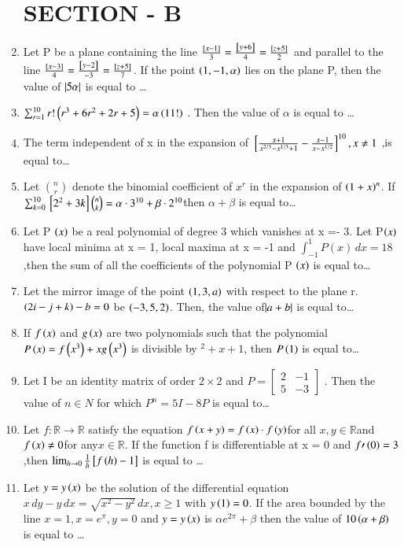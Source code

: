 \documentclass[journal,12pt,twocolumn]{IEEEtran}
\theoremstyle{remark}
\begin{document}
\begin{enumerate}[start=16]
\section{SECTION - B}
\item Let P be a plane containing the line $
\frac{{}\left[x - 1\right]}{3} = \frac{{}\left[y + 6\right]}{4} = \frac{{}\left[z + 5\right]}{2} $ and parallel to the line $
		\frac{{}\left[x - 3\right]}{4} = \frac{{}\left[y - 2\right]}{-3} = \frac{{}\left[z + 5\right]}{7} $. If the point $\left(1,-1,\alpha\right)$ lies on the plane P, then the value of $\left\vert5\alpha\right\vert$ is equal to \dots
\item $\sum_{r=1}^{10} r!\left( r^3 + 6r^2 + 2r + 5 \right) = \alpha \left(11!\right)$ . Then the value of $\alpha$ is equal to \dots
\item The term independent of x in the expansion of $
{}\left[ \frac{x + 1}{x^{2/3} - x^{1/3} + 1} - \frac{x - 1}{x - x^{1/2}} \right]^{10} , x \neq 1$ ,is equal to\dots
\item  Let $ \binom{n}{r} $ denote the binomial coefficient of $ x^r $ in the expansion of $ \left(1+x\right)^n $. If $    \sum_{k=0}^{10} {}\left[2^2 + 3k\right] \binom{n}{k} = \alpha \cdot 3^{10} + \beta \cdot 2^{10}$then $\alpha + \beta$ is equal to\dots
\item  Let P $\left(x\right)$ be a real polynomial of degree 3 which vanishes at x =- 3. Let P$\left(x\right)$ have local minima at x = 1, local maxima at x = -1 and $\int_{-1}^{1} P(x) \, dx = 18$,then the sum of all the coefficients of the polynomial P $\left(x\right)$ is equal to\dots
\item   Let the mirror image of the point $\left(1, 3, a\right)$ with respect to the plane r. $\left(2i - j + k\right) - b = 0$ be $\left(-3, 5, 2\right)$. Then, the value of$ \left\vert a + b\right\vert$ is equal to\dots
\item If $f\left(x\right)$ and $g\left(x\right)$ are two polynomials such that the polynomial $P \left(x\right) = f \left(x^3\right) + x g \left(x^3\right)$ is divisible by $^2 + x + 1$, then $P \left(1\right)$ is equal to\dots
\item  Let I be an identity matrix of order $2 \times 2$  and $
P = \begin{bmatrix} 
2 & -1 \\ 
5 & -3 
\end{bmatrix}
$ . Then the value of $n\in N$ for which $P^n=5I-8P$ is equal to\dots
\item Let  $f : \mathbb{R} \to \mathbb{R}$ satisfy the equation 
$
f\left(x + y\right) = f\left(x\right) \cdot f\left(y\right)$for all $x, y \in \mathbb{R} $and $ f\left(x\right) \neq 0 $for any$ x \in \mathbb{R}
$. If the function f is differentiable at x = 0 and $f\prime\left(0\right)=3$,then $
\lim_{h \to 0} \frac{1}{h}  {}\left[f\left(h\right) - 1 \right]$ is equal to \dots
\item Let $y = y \left(x\right)$ be the solution of the differential equation $x \, dy - y \, dx = \sqrt{x^2 - y^2} \, dx, x \geq 1
$ with $y\left(1\right)=0$. If the area bounded by the line $x = 1, x = e^\pi, y = 0$ and $y = y\left(x\right)$ is $ \alpha e^{2\pi} + \beta $ then the value of $10 \left(\alpha + \beta\right)$ is equal to \dots







\end{enumerate}
\end{document}
